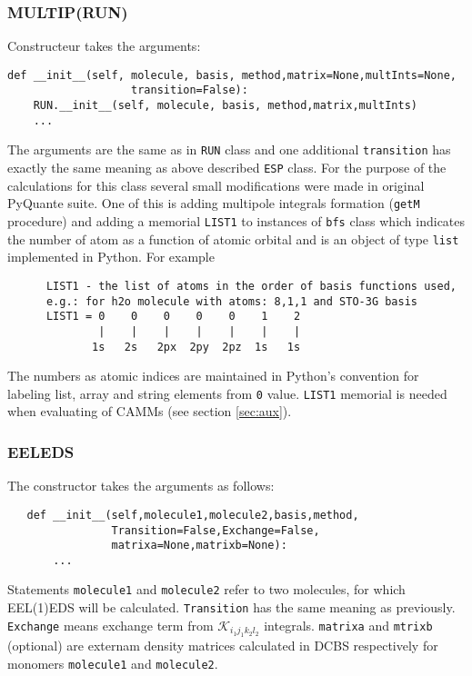 \documentclass[a4paper,titlepage,twoside,fleqn]{article}
\begin{document}
\subsubsection{MULTIP(RUN)}
Constructeur takes the arguments:
\begin{verbatim}
def __init__(self, molecule, basis, method,matrix=None,multInts=None,
                   transition=False):
    RUN.__init__(self, molecule, basis, method,matrix,multInts)
    ...
\end{verbatim} 
The arguments are the same as in \verb+RUN+ class and one additional 
\verb+transition+ has exactly the same meaning as above described 
\verb+ESP+ class. For the purpose of the calculations for this class
several small modifications were made in original PyQuante suite. One of this
is adding multipole integrals formation (\verb+getM+ procedure) and 
adding a memorial \verb+LIST1+ to instances of \verb+bfs+ class which
indicates the number of atom as a function of atomic orbital and is 
an object of type \verb+list+ implemented in Python. For example
\begin{verbatim}
      LIST1 - the list of atoms in the order of basis functions used, 
      e.g.: for h2o molecule with atoms: 8,1,1 and STO-3G basis 
      LIST1 = 0    0    0    0    0    1    2
              |    |    |    |    |    |    |
             1s   2s   2px  2py  2pz  1s   1s
\end{verbatim}
The numbers as atomic indices are maintained in Python's convention
for labeling list, array and string elements from \verb+0+ value.
\verb+LIST1+ memorial is needed when evaluating of CAMMs (see section \ref{sec:aux}). 

\subsubsection{EELEDS}
The constructor takes the arguments as follows:
\begin{verbatim}
   def __init__(self,molecule1,molecule2,basis,method,
                Transition=False,Exchange=False,
                matrixa=None,matrixb=None):
       ...
\end{verbatim}
Statements \verb+molecule1+ and \verb+molecule2+ refer to two molecules, 
for which EEL(1)EDS will be calculated. \verb+Transition+ has the same meaning
as previously. \verb+Exchange+ means exchange term from $\mathscr{K}_{i_1j_1k_2l_2}$ 
integrals. \verb+matrixa+ and \verb+mtrixb+ (optional) are externam density matrices
calculated in DCBS respectively for monomers \verb+molecule1+ and \verb+molecule2+.
\end{document}
